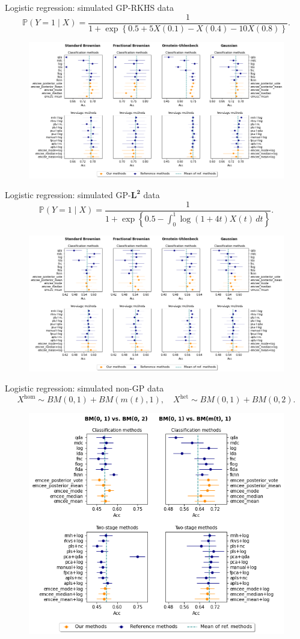 \documentclass[9pt, english, professionalfonts]{beamer}
\renewcommand{\P} {\ensuremath{\mathds{P}}}
\begin{document}
\begin{frame}{Logistic regression: simulated GP-RKHS data}
\[
  \P(Y=1\mid X) = \frac{1}{1 + \exp\left\{0.5 +5X(0.1) - X(0.4) - 10X(0.8)\right\}}.
\]
  \begin{figure}
    \includegraphics[width=.95\textwidth]{clf_emcee_rkhs}
  \end{figure}
\end{frame}

\begin{frame}{Logistic regression: simulated GP-\(\bm{L^2}\) data}
  \[
  \P(Y=1\mid X) = \frac{1}{\displaystyle 1 + \exp\left\{0.5 - \int_0^1 \log(1+4t) X(t)\, dt\right\}}.
  \]
  \begin{figure}
    \includegraphics[width=.95\textwidth]{clf_emcee_l2}
  \end{figure}
\end{frame}

\begin{frame}{Logistic regression: simulated non-GP data}
  \[
  X^{\text{hom}} \sim BM(0, 1) + BM(m(t), 1), \quad X^{\text{het}} \sim BM(0, 1) + BM(0, 2).
  \]
  \begin{figure}
    \includegraphics[width=.6\textwidth]{clf_emcee_nongp}
  \end{figure}
\end{frame}
\end{document}
